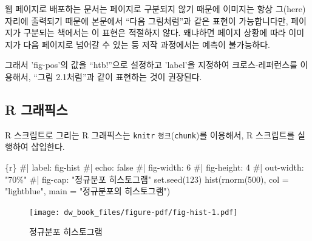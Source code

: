 \documentclass[
  letterpaper,
]{book}
\newenvironment{Shaded}{\begin{snugshade}}{\end{snugshade}}
\newcommand{\InformationTok}[1]{\textcolor[rgb]{0.37,0.37,0.37}{#1}}
\begin{document}
\begin{tcolorbox}[enhanced jigsaw, opacityback=0, opacitybacktitle=0.6, colback=white, rightrule=.15mm, coltitle=black, colframe=quarto-callout-note-color-frame, colbacktitle=quarto-callout-note-color!10!white, bottomrule=.15mm, bottomtitle=1mm, breakable, title=\textcolor{quarto-callout-note-color}{\faInfo}\hspace{0.5em}{fig-pos과 label}, titlerule=0mm, leftrule=.75mm, toptitle=1mm, left=2mm, arc=.35mm, toprule=.15mm]

웹 페이지로 배포하는 문서는 페이지로 구분되지 않기 때문에 이미지는 항상
그(here) 자리에 출력되기 때문에 본문에서 ``다음 그림처럼''과 같은 표현이
가능합니다만, 페이지가 구분되는 책에서는 이 표현은 적절하지 않다.
왜냐하면 페이지 상황에 따라 이미지가 다음 페이지로 넘어갈 수 있는 등
저작 과정에서는 예측이 불가능하다.

그래서 'fig-pos'의 값을 ``htb!''으로 설정하고 'label'을 지정하여
크로스-레퍼런스를 이용해서, ``그림 2.1처럼''과 같이 표현하는 것이
권장된다.

\end{tcolorbox}

\hypertarget{r-uxadf8uxb798uxd53duxc2a4}{%
\subsection{R 그래픽스}\label{r-uxadf8uxb798uxd53duxc2a4}}

R 스크립트로 그리는 R 그래픽스는 \texttt{knitr}
\texttt{청크}(\texttt{chunk})를 이용해서, R 스크립트를 실행하여
삽입한다.

\begin{Shaded}
\begin{Highlighting}[]
\InformationTok{\textasciigrave{}\textasciigrave{}\textasciigrave{}\{r\}}
\InformationTok{\#| label: fig{-}hist}
\InformationTok{\#| echo: false}
\InformationTok{\#| fig{-}width: 6}
\InformationTok{\#| fig{-}height: 4}
\InformationTok{\#| out{-}width: "70\%"}
\InformationTok{\#| fig{-}cap: "정규분포 히스토그램"}
\InformationTok{set.seed(123)}
\InformationTok{hist(rnorm(500), col = "lightblue", main = "정규분포의 히스토그램")}
\InformationTok{\textasciigrave{}\textasciigrave{}\textasciigrave{}}
\end{Highlighting}
\end{Shaded}

\begin{figure}

{\centering \texttt{[image: dw\_book\_files/figure-pdf/fig-hist-1.pdf]}

}

\caption{\label{fig-hist}정규분포 히스토그램}

\end{figure}
\end{document}
